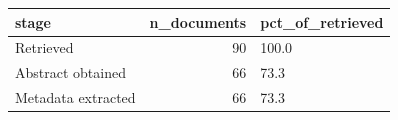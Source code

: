 \begin{tabular}{lrl}
\toprule
stage & n\_documents & pct\_of\_retrieved \\
\midrule
Retrieved & 90 & 100.0 \\
Abstract obtained & 66 & 73.3 \\
Metadata extracted & 66 & 73.3 \\
\bottomrule
\end{tabular}
